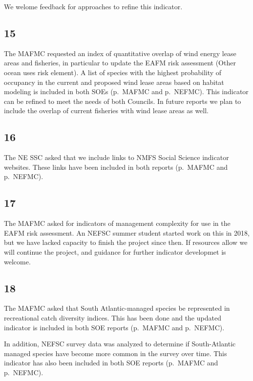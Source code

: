 \documentclass[
  10pt,
]{article}
\begin{document}
We welome feedback for approaches to refine this indicator.

\hypertarget{section-14}{%
\subsection{15}\label{section-14}}

The MAFMC requested an index of quantitative overlap of wind energy
lease areas and fisheries, in particular to update the EAFM risk
assessment (Other ocean uses risk element). A list of species with the
highest probability of occupancy in the current and proposed wind lease
areas based on habitat modeling is included in both SOEs (p.~MAFMC and
p.~NEFMC). This indicator can be refined to meet the needs of both
Councils. In future reports we plan to include the overlap of current
fisheries with wind lease areas as well.

\hypertarget{section-15}{%
\subsection{16}\label{section-15}}

The NE SSC asked that we include links to NMFS Social Science indicator
websites. These links have been included in both reports (p.~MAFMC and
p.~NEFMC).

\hypertarget{section-16}{%
\subsection{17}\label{section-16}}

The MAFMC asked for indicators of management complexity for use in the
EAFM risk assessment. An NEFSC summer student started work on this in
2018, but we have lacked capacity to finish the project since then. If
resources allow we will continue the project, and guidance for further
indicator developmet is welcome.

\hypertarget{section-17}{%
\subsection{18}\label{section-17}}

The MAFMC asked that South Atlantic-managed species be represented in
recreational catch diversity indices. This has been done and the updated
indicator is included in both SOE reports (p.~MAFMC and p.~NEFMC).

In addition, NEFSC survey data was analyzed to determine if
South-Atlantic managed species have become more common in the survey
over time. This indicator has also been included in both SOE reports
(p.~MAFMC and p.~NEFMC).
\end{document}
